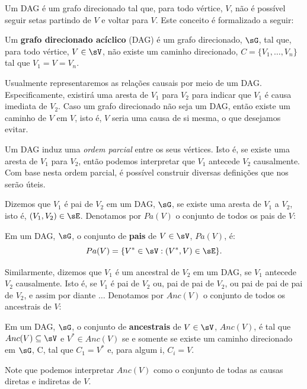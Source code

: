 Um DAG é um grafo direcionado tal que,
para todo vértice, $V$, não é possível
seguir setas partindo de $V$ e
voltar para $V$. Este conceito é
formalizado a seguir:

\begin{definition}
 \label{def:dag}
 Um \textbf{grafo direcionado acíclico} (DAG) é
 um grafo direcionado, $\sG$,
 tal que, para todo
 vértice, $V \in \sV$, não existe um
 caminho direcionado, $C = \{V_1, \ldots, V_n\}$
 tal que $V_1 = V = V_n$.
\end{definition}

Usualmente representaremos
as relações causais por meio de um DAG.
Especificamente, existirá uma aresta de $V_1$ para $V_2$
para indicar que $V_1$ é causa imediata de $V_2$.
Caso um grafo direcionado não seja um DAG,
então existe um caminho de $V$ em $V$, isto é,
$V$ seria uma causa de si mesma, 
o que desejamos evitar.

Um DAG induz uma \textit{ordem parcial} entre 
os seus vértices. Isto é,
se existe uma aresta de $V_1$ para $V_2$,
então podemos interpretar que
$V_1$ antecede $V_2$ causalmente.
Com base nesta ordem parcial, é
possível construir diversas
definições que nos serão úteis.

Dizemos que $V_1$ é pai de $V_2$ em
um DAG, $\sG$, se
existe uma aresta de $V_1$ a $V_2$,
isto é, $(V_1, V_2) \in \sE$.
Denotamos por $Pa(V)$ o
conjunto de todos os pais de $V$:

\begin{definition}
 \label{def:pais}
 Em um DAG, $\sG$,
 o conjunto de \textbf{pais} de $V \in \sV$, $Pa(V)$, é:
 $$Pa(V) = \{V^* \in \sV: (V^*, V) \in \sE\}.$$
\end{definition}

Similarmente, dizemos que $V_1$ é um ancestral de $V_2$ em
um DAG, se $V_1$ antecede $V_2$ causalmente. Isto é,
se $V_1$ é pai de $V_2$ ou, pai de pai de $V_2$, ou
pai de pai de pai de $V_2$, e assim por diante $\ldots$
Denotamos por $Anc(V)$ o conjunto de todos os ancestrais de $V$:

\begin{definition}
 \label{def:ancestrais}
 Em um DAG, $\sG$,
 o conjunto de \textbf{ancestrais} de $V \in \sV$, $Anc(V)$, é tal que
 $Anc(V) \subseteq \sV$ e
 $V^* \in Anc(V)$ se e somente se existe
 um caminho direcionado em $\sG$, C, tal que
 $C_1 = V^*$ e, para algum i, $C_i = V$.
\end{definition}

Note que podemos interpretar $Anc(V)$ como
o conjunto de todas as causas diretas e indiretas de $V$.

